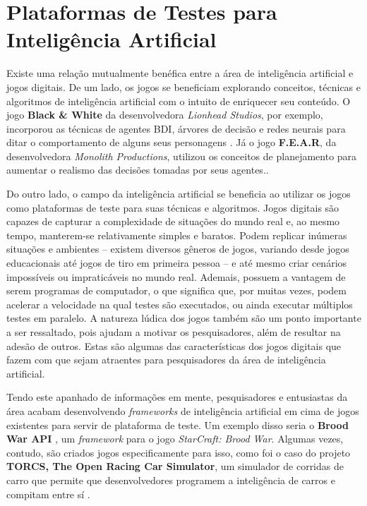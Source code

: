 \section{Plataformas de Testes para Inteligência Artificial}
Existe uma relação mutualmente benéfica entre a área de inteligência artificial
e jogos digitais.  De um lado, os jogos se beneficiam explorando conceitos,
técnicas e algoritmos de inteligência artificial com o intuito de enriquecer
seu conteúdo. O jogo \textbf{Black \& White} da desenvolvedora \textit{Lionhead
Studios}, por exemplo, incorporou as técnicas de agentes BDI, árvores de
decisão e redes neurais para ditar o comportamento de alguns seus personagens
\cite{TOPAIGAMES}. Já o jogo \textbf{F.E.A.R}, da desenvolvedora
\textit{Monolith Productions}, utilizou os conceitos de planejamento para
aumentar o realismo das decisões tomadas por seus agentes.\cite{FEARPLANNING}.

Do outro lado, o campo da inteligência artificial se beneficia ao utilizar os
jogos como plataformas de teste para suas técnicas e algoritmos. Jogos digitais
são capazes de capturar a complexidade de situações do mundo real e, ao mesmo
tempo, manterem-se relativamente simples e baratos. Podem replicar inúmeras
situações e ambientes -- existem diversos gêneros de jogos, variando desde
jogos educacionais até jogos de tiro em primeira pessoa -- e até mesmo criar
cenários impossíveis ou impraticáveis no mundo real. Ademais, possuem a
vantagem de serem programas de computador, o que significa que, por muitas
vezes, podem acelerar a velocidade na qual testes são executados, ou ainda
executar múltiplos testes em paralelo. A natureza lúdica dos jogos também são
um ponto importante a ser ressaltado, pois ajudam a motivar os pesquisadores,
além de resultar na adesão de outros. Estas são algumas das características dos
jogos digitais que fazem com que sejam atraentes para pesquisadores da área de
inteligência artificial.

Tendo este apanhado de informações em mente, pesquisadores e entusiastas da
área acabam desenvolvendo \textit{frameworks} de inteligência artificial em
cima de jogos existentes para servir de plataforma de teste. Um exemplo disso
seria o \textbf{Brood War API} \cite{BWAPI}, um \textit{framework} para o jogo
\textit{StarCraft: Brood War}. Algumas vezes, contudo, são criados jogos
especificamente para isso, como foi o caso do projeto \textbf{TORCS, The Open
Racing Car Simulator}, um simulador de corridas de carro que permite que
desenvolvedores programem a inteligência de carros e compitam entre sí
\cite{TORCSWEB}.

